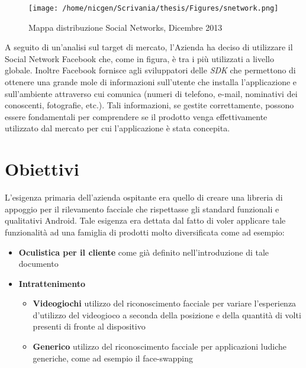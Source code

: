 \begin{figure}[H]\centering  
\texttt{[image: /home/nicgen/Scrivania/thesis/Figures/snetwork.png]}
\caption[Mappa distribuzione Social Networks]{Mappa distribuzione Social Networks, Dicembre 2013}
\label{pic-a}
\end{figure}

A seguito di un'analisi sul target di mercato, l'Azienda ha deciso di utilizzare il Social Network Facebook che, come in figura, è tra i più utilizzati a livello globale. Inoltre Facebook fornisce agli sviluppatori delle \textit{SDK} che permettono di ottenere una grande mole di informazioni sull'utente che installa l'applicazione e sull'ambiente attraverso cui comunica (numeri di telefono, e-mail, nominativi dei conoscenti, fotografie, etc.). Tali informazioni, se gestite correttamente, possono essere fondamentali per comprendere se il prodotto venga effettivamente utilizzato dal mercato per cui l'applicazione è stata concepita.


\section{Obiettivi}

L'esigenza primaria dell'azienda ospitante era quello di creare una libreria di appoggio per il rilevamento facciale che rispettasse gli standard funzionali e qualitativi Android. Tale esigenza era dettata dal fatto di voler applicare tale funzionalità ad una famiglia di prodotti molto diversificata come ad esempio:

\begin{itemize}
\item \textbf{Oculistica per il cliente} come già definito nell'introduzione di tale documento
\item \textbf{Intrattenimento}
\begin{itemize}
\item \textbf{Videogiochi} 
utilizzo del riconoscimento facciale per variare l'esperienza d'utilizzo del videogioco a seconda della posizione e della quantità di volti presenti di fronte al dispositivo
\item \textbf{Generico}
utilizzo del riconoscimento facciale per applicazioni ludiche generiche, come ad esempio il face-swapping
\end{itemize}
\end{itemize}  


